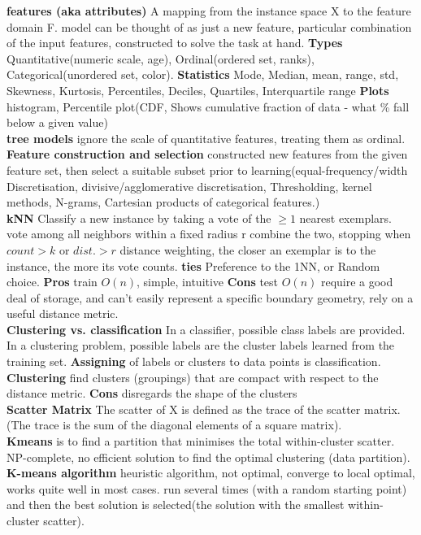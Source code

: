 \documentclass[cheatsheet.tex]{subfiles}
\begin{document}
\textbf{features (aka attributes)} A mapping from the instance space X to the feature domain F. model can be thought of as just a new feature, particular combination of the input features, constructed to solve the task at hand. \textbf{Types} Quantitative(numeric scale, age), Ordinal(ordered set, ranks), Categorical(unordered set, color). \textbf{Statistics} Mode, Median, mean, range, std, Skewness, Kurtosis, Percentiles, Deciles, Quartiles, Interquartile range \textbf{Plots} histogram, Percentile plot(CDF, Shows cumulative fraction of data - what \% fall below a given value)
\\
\textbf{tree models} ignore the scale of quantitative features, treating them as ordinal.
\\
\textbf{Feature construction and selection} constructed new features from the given feature set, then select a suitable subset prior to learning(equal-frequency/width Discretisation, divisive/agglomerative discretisation, Thresholding, kernel methods, N-grams, Cartesian products of categorical features.)
\\
\textbf{kNN} \textbullet Classify a new instance by taking a vote of the $\geq1$ nearest exemplars. \textbullet vote among all neighbors within a fixed radius r \textbullet combine the two, stopping when $count > k$ or $dist. > r$ \textbullet distance weighting, the closer an exemplar is to the instance, the more its vote counts. \textbf{ties} Preference to the 1NN, or Random choice. 
\textbf{Pros} train $O(n)$, simple, intuitive 
\textbf{Cons} test $O(n)$ require a good deal of storage, and can't easily represent a specific boundary geometry, rely on a useful distance metric.
\\
\textbf{Clustering vs. classification} In a classifier, possible class labels are provided. In a clustering problem, possible labels are the cluster labels learned from the training set. \textbf{Assigning} of labels or clusters to data points is classification.
\\
\textbf{Clustering} find clusters (groupings) that are compact with respect to the distance metric. \textbf{Cons} disregards the shape of the clusters
\\
\textbf{Scatter Matrix} The scatter of X is defined as the trace of the scatter matrix.(The trace is the sum of the diagonal elements of a square matrix). 
\\
\textbf{Kmeans} is to find a partition that minimises the total within-cluster scatter. NP-complete, no efficient solution to find the optimal clustering (data partition). \textbf{K-means algorithm} heuristic algorithm, not optimal, converge to local optimal, works quite well in most cases. run several times (with a random starting point) and then the best solution is selected(the solution with the smallest within-cluster scatter). 
\end{document}
